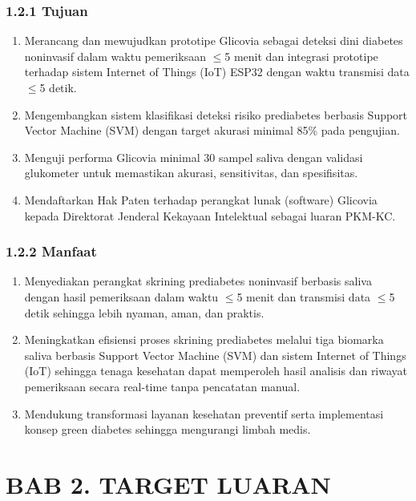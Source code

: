 \documentclass[12pt,a4paper]{article}
\begin{document}
\subsubsection*{1.2.1 Tujuan}
\begin{enumerate}
    \item Merancang dan mewujudkan prototipe Glicovia sebagai deteksi dini diabetes noninvasif dalam waktu pemeriksaan $\le$5 menit dan integrasi prototipe terhadap sistem Internet of Things (IoT) ESP32 dengan waktu transmisi data $\le$5 detik.
    \item Mengembangkan sistem klasifikasi deteksi risiko prediabetes berbasis Support Vector Machine (SVM) dengan target akurasi minimal 85\% pada pengujian.
    \item Menguji performa Glicovia minimal 30 sampel saliva dengan validasi glukometer untuk memastikan akurasi, sensitivitas, dan spesifisitas.
    \item Mendaftarkan Hak Paten terhadap perangkat lunak (software) Glicovia kepada Direktorat Jenderal Kekayaan Intelektual sebagai luaran PKM-KC.
\end{enumerate}

\subsubsection*{1.2.2 Manfaat}
\begin{enumerate}
    \item Menyediakan perangkat skrining prediabetes noninvasif berbasis saliva dengan hasil pemeriksaan dalam waktu $\le$5 menit dan transmisi data $\le$5 detik sehingga lebih nyaman, aman, dan praktis.
    \item Meningkatkan efisiensi proses skrining prediabetes melalui tiga biomarka saliva berbasis Support Vector Machine (SVM) dan sistem Internet of Things (IoT) sehingga tenaga kesehatan dapat memperoleh hasil analisis dan riwayat pemeriksaan secara real-time tanpa pencatatan manual.
    \item Mendukung transformasi layanan kesehatan preventif serta implementasi konsep green diabetes sehingga mengurangi limbah medis.
\end{enumerate}

\section*{BAB 2. TARGET LUARAN}
\end{document}
